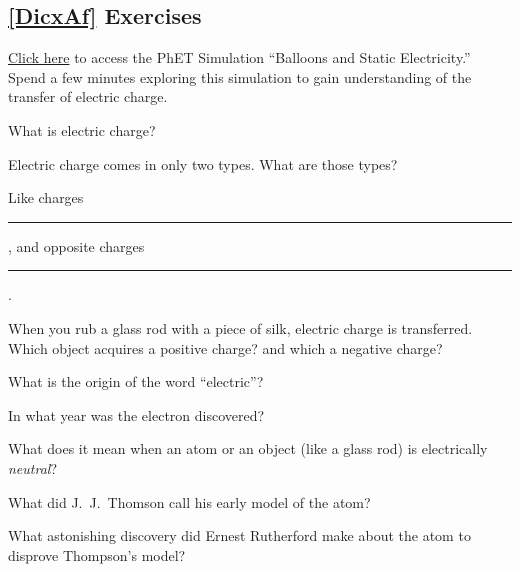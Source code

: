 \documentclass[dvipsnames]{article}
\numberwithin{equation}{section}
\numberwithin{figure}{section}
\begin{document}
\subsection*{\ref{DicxAf} Exercises}

\begin{exercise}
    \href{https://phet.colorado.edu/en/simulations/balloons-and-static-electricity/about}{Click here} to access the PhET Simulation ``Balloons and Static Electricity.'' Spend a few minutes exploring this simulation to gain understanding of the transfer of electric charge.
\end{exercise}

\begin{exercise}
    What is electric charge?
\end{exercise}

\begin{exercise}
    Electric charge comes in only two types. What are those types?
\end{exercise}

\begin{exercise}
    Like charges \rule{2cm}{0.15mm}, and opposite charges \rule{2cm}{0.15mm}.
\end{exercise}

\begin{exercise}
    When you rub a glass rod with a piece of silk, electric charge is transferred. Which object acquires a positive charge? and which a negative charge?
\end{exercise}

\begin{exercise}
    What is the origin of the word ``electric''?
\end{exercise}

\begin{exercise}
    In what year was the electron discovered?
\end{exercise}

\begin{exercise}
    What does it mean when an atom or an object (like a glass rod) is electrically \textit{neutral}?
\end{exercise}

\begin{exercise}
    What did J.~J.~Thomson call his early model of the atom?
\end{exercise}

\begin{exercise}
    What astonishing discovery did Ernest Rutherford make about the atom to disprove Thompson's model?
\end{exercise}
\end{document}
